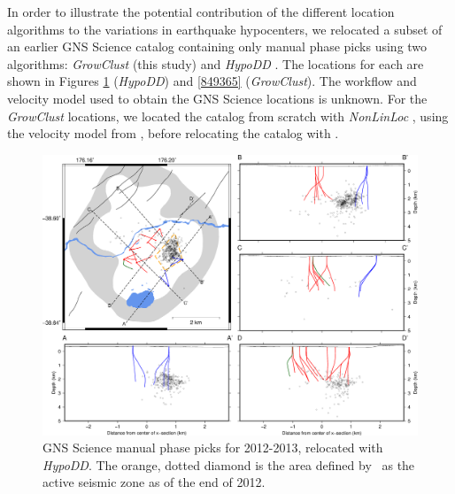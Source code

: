 In order to illustrate the potential contribution of the different location algorithms to the variations in earthquake hypocenters, we relocated a subset of an earlier GNS Science catalog containing only manual phase picks using two algorithms: \textit{GrowClust} (this study) \citep{Trugman_2017} and \textit{HypoDD} \citet{Sherburn_2015,Sewell_2015WGC,Waldhauser_2000}. The locations for each are shown in Figures \ref{268878} (\textit{HypoDD}) and \ref{849365} (\textit{GrowClust}). The workflow and velocity model used to obtain the GNS Science locations is unknown. For the \textit{GrowClust} locations, we located the catalog from scratch with \textit{NonLinLoc} \citep{Lomax_2014}, using the velocity model from \citet{sewell2017}, before relocating the catalog with .
\begin{figure}[h!]
\begin{center}
\includegraphics[width=0.98\columnwidth]{Chapter_4_Rot/figures/merc_Rot_GNS_DD1/merc_Rot_GNS_DD1_original}
\caption{{GNS Science manual phase picks for 2012-2013, relocated with
\emph{HypoDD}. The orange, dotted diamond is the area defined
by~\protect\citet{Sherburn_2015} as the active seismic zone as of the end of 2012.
{\label{268878}}%
}}
\end{center}
\end{figure}
